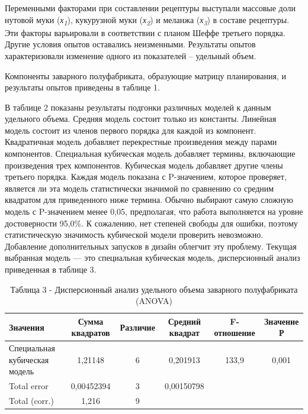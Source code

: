 \begin{multicols}{2}
  
Переменными факторами при составлении рецептуры выступали массовые доли
нутовой муки (\emph{х\textsubscript{1}}), кукурузной муки
(\emph{х\textsubscript{2}}) и меланжа (\emph{х\textsubscript{3}}) в
составе рецептуры. Эти факторы варьировали в соответствии с планом Шеффе
третьего порядка. Другие условия опытов оставались неизменными.
Результаты опытов характеризовали изменение одного из показателей --
удельный объем.

Компоненты заварного полуфабриката, образующие матрицу планирования, и
результаты опытов приведены в таблице 1.

В таблице 2 показаны результаты подгонки различных моделей к данным
удельного объема. Средняя модель состоит только из константы. Линейная
модель состоит из членов первого порядка для каждой из компонент.
Квадратичная модель добавляет перекрестные произведения между парами
компонентов. Специальная кубическая модель добавляет термины, включающие
произведения трех компонентов. Кубическая модель добавляет другие члены
третьего порядка. Каждая модель показана с P-значением, которое
проверяет, является ли эта модель статистически значимой по сравнению со
средним квадратом для приведенного ниже термина. Обычно выбирают самую
сложную модель с P-значением менее 0,05, предполагая, что работа
выполняется на уровне достоверности 95,0\%. К сожалению, нет степеней
свободы для ошибки, поэтому статистическую значимость кубической модели
проверить невозможно. Добавление дополнительных запусков в дизайн
облегчит эту проблему. Текущая выбранная модель --- это специальная
кубическая модель, дисперсионный анализ приведенная в таблице 3.
\end{multicols}

\begin{table}[H]
\caption*{Таблица 3 - Дисперсионный анализ удельного объема заварного полуфабриката (ANOVA)}
\centering
\begin{tabular}{|l|c|c|c|c|c|}
\hline
Значения                      & Сумма квадратов & Различие & Средний квадрат & F-отношение & Значение Р \\ \hline
\begin{minipage}{2.5cm}Специальная кубическая модель\end{minipage} & 1,21148         & 6        & 0,201913        & 133,9       & 0,001      \\ \hline
Total error                   & 0,00452394      & 3        & 0,00150798      &             &            \\ \hline
Total (corr.)                 & 1,216           & 9        &                 &             &            \\ \hline
\end{tabular}
\end{table}

